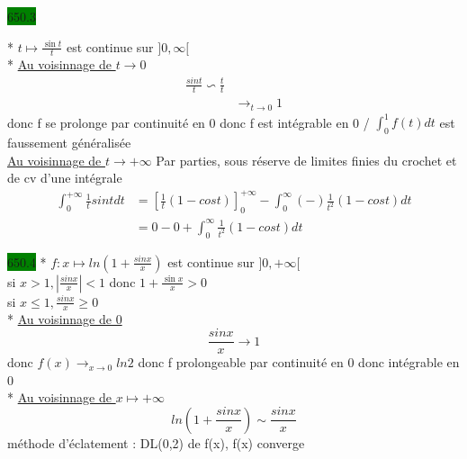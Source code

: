 \documentclass{article}
\begin{document}
    
\noindent \colorbox{green}{650.3}

* \(t \mapsto \frac{\sin t}{t}\) est continue sur \(]0, \infty[\)\\
* \underline{Au voisinnage de \(t \rightarrow 0\)}
\begin{align*}
    \frac{sint}{t} \backsim \frac{t}{t}\\
    & \rightarrow_{t \rightarrow 0} 1
\end{align*}
donc f se prolonge par continuité en 0 donc f est intégrable en 0 / \(\int_{0}^{1}f(t)dt\) est 
faussement généralisée \\

\noindent \underline{Au voisinnage de \(t \rightarrow +\infty\)}
Par parties, sous réserve de limites finies du crochet et de cv d'une intégrale 
\begin{align*}
  \int_{0}^{+\infty} \frac{1}{t} sint dt &= [\frac{1}{t}(1-cost)]^{+\infty}_{0} - \int_{0}^{\infty} (-) \frac{1}{t^{2}}(1-cost)dt \\ 
                                         &= 0 - 0 + \int_{0}^{\infty}\frac{1}{t^{2}}(1-cost)dt
\end{align*}

\noindent \colorbox{green}{650.4}
* \(f : x \mapsto ln(1 + \frac{sinx}{x})\) est continue sur \(]0, +\infty[\)\\
si \(x > 1, |\frac{sinx}{x}| < 1\) donc \(1 + \frac{\sin x}{x}>0\)\\
si \(x \leq 1, \frac{sinx}{x} \geq 0\)\\
* \underline{Au voisinnage de 0}\\
\begin{equation*}
    \frac{sinx}{x} \to 1
\end{equation*}
donc \(f(x) \to_{x \to 0} ln 2\)
donc f prolongeable par continuité en 0 donc intégrable en 0\\
* \underline{Au voisinnage de \(x \mapsto +\infty\)}\\
\begin{equation*}
    ln(1 + \frac{sinx}{x}) \sim \frac{sinx}{x}
\end{equation*}
méthode d'éclatement : DL(0,2) de f(x), f(x) converge \\
\end{document}
